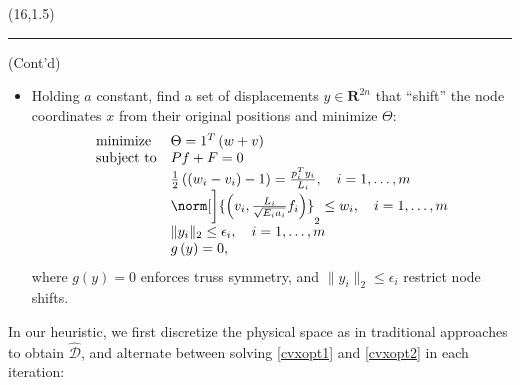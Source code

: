 \documentclass[a0]{a0poster}
\renewenvironment{leftbar}[1][\hsize]
{%
\def\FrameCommand 
{%

    {\color{black}\vrule width 0pt}%
    \hspace{0pt}%
    \fboxsep=\FrameSep\colorbox{white}%
}%
\MakeFramed{\hsize#1\advance\hsize-\width\FrameRestore}%
}
{\endMakeFramed}
\begin{document}
\begin{textblock}{7.0}(16,1.5)

\hrule
\medskip
(Cont'd)

\begin{itemize}

  \item Holding \(a\) constant, find a set of displacements \(y\in\mathbf{R}^{2n}\) that ``shift'' the node coordinates \(x\) from their original positions and minimize \(\Theta\):
  {\small
  \begin{equation}
    \begin{array}{ll}
      \mbox{minimize}   & \Theta = 1^{T}\left(w+v \right)\\
      \mbox{subject to} & Pf+F = 0\\
                        & \frac{1}{2}\left( \left( w_{i} - v_{i} \right) - 1 \right) = \frac{p_{i}^{T}y_{i}}{L_{i}},\ \ \ i = 1,\ldots,m\\
                        & \norm[\bigg]{ \left( v_{i},\frac{L_{i}}{\sqrt{E_{i}a_{i}}}f_{i} \right)}_{2}\leq w_{i},\ \ \ i = 1,\ldots,m\\
                        & \|y_{i}\|_{2} \leq \epsilon_{i},\ \ \ i = 1,\ldots,m\\
                            & g\left(y\right) = 0,
    \end{array}
    \label{cvxopt2}
  \end{equation}
  }
  where \(g(y) = 0 \) enforces truss symmetry, and \(\|y_{i}\|_{2} \leq\epsilon_{i}\) restrict node shifts.

\end{itemize}
  
In our heuristic, we first discretize the physical space as in traditional approaches to obtain \(\hat{\mathcal{D}}\), and alternate between solving \eqref{cvxopt1} and \eqref{cvxopt2} in each iteration:
\medskip


\end{textblock}
\end{document}
